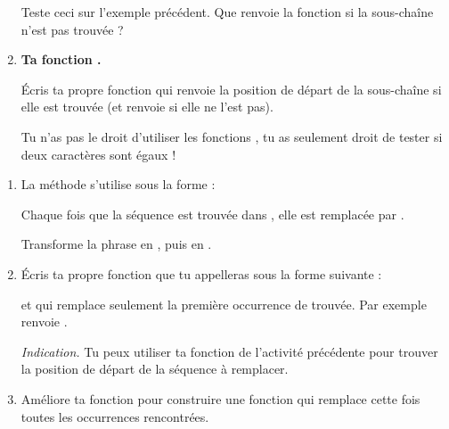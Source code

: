 \documentclass[11pt,class=report,crop=false]{standalone}
\begin{document}
\begin{activite}[Chercher]
\begin{enumerate}
  Teste ceci sur l'exemple précédent. Que renvoie la fonction si la sous-chaîne n'est pas trouvée ?
 
  
  \item \textbf{Ta fonction .}
  
  Écris ta propre fonction  qui renvoie la position de départ de la sous-chaîne si elle est trouvée (et renvoie  si elle ne l'est pas).
  
  Tu n'as pas le droit d'utiliser les fonctions \Python{}, tu as seulement droit de tester si deux caractères sont égaux !  
  
\end{enumerate}   
     
\end{activite}



\begin{activite}[Remplacer]


\begin{enumerate}
  \item  La méthode  s'utilise sous la forme :\\
  \centerline{}

	
	Chaque fois que la séquence  est trouvée dans , elle est remplacée par .
	
	Transforme la phrase  en , puis en 
	.
	
	\item Écris ta propre fonction  que tu appelleras sous la forme suivante :\\
  \centerline{}
 et qui remplace seulement la première occurrence de  trouvée. Par exemple  renvoie .
  
  
  \emph{Indication.} Tu peux utiliser ta fonction  de l'activité précédente pour trouver la position de départ de la séquence à remplacer.
  
 	\item Améliore ta fonction pour construire une fonction  qui remplace cette fois toutes les occurrences rencontrées.
 	    
\end{enumerate}    
\end{activite}
\end{document}
